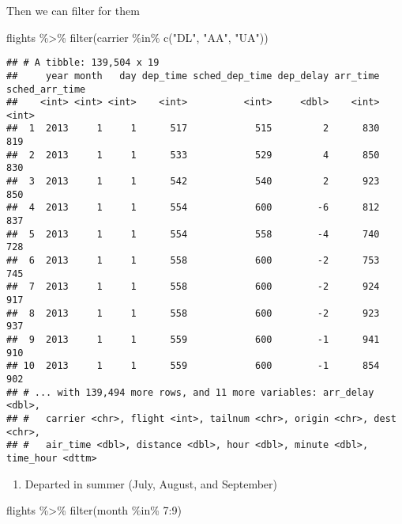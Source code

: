 \documentclass[
]{article}
\newenvironment{Shaded}{\begin{snugshade}}{\end{snugshade}}
\newcommand{\DecValTok}[1]{\textcolor[rgb]{0.00,0.00,0.81}{#1}}
\newcommand{\FunctionTok}[1]{\textcolor[rgb]{0.00,0.00,0.00}{#1}}
\newcommand{\NormalTok}[1]{#1}
\newcommand{\SpecialCharTok}[1]{\textcolor[rgb]{0.00,0.00,0.00}{#1}}
\newcommand{\StringTok}[1]{\textcolor[rgb]{0.31,0.60,0.02}{#1}}
\providecommand{\tightlist}{%
  \setlength{\itemsep}{0pt}\setlength{\parskip}{0pt}}
\begin{document}
Then we can filter for them

\begin{Shaded}
\begin{Highlighting}[]
\NormalTok{flights }\SpecialCharTok{\%\textgreater{}\%} \FunctionTok{filter}\NormalTok{(carrier }\SpecialCharTok{\%in\%} \FunctionTok{c}\NormalTok{(}\StringTok{"DL"}\NormalTok{, }\StringTok{"AA"}\NormalTok{, }\StringTok{"UA"}\NormalTok{))}
\end{Highlighting}
\end{Shaded}

\begin{verbatim}
## # A tibble: 139,504 x 19
##     year month   day dep_time sched_dep_time dep_delay arr_time sched_arr_time
##    <int> <int> <int>    <int>          <int>     <dbl>    <int>          <int>
##  1  2013     1     1      517            515         2      830            819
##  2  2013     1     1      533            529         4      850            830
##  3  2013     1     1      542            540         2      923            850
##  4  2013     1     1      554            600        -6      812            837
##  5  2013     1     1      554            558        -4      740            728
##  6  2013     1     1      558            600        -2      753            745
##  7  2013     1     1      558            600        -2      924            917
##  8  2013     1     1      558            600        -2      923            937
##  9  2013     1     1      559            600        -1      941            910
## 10  2013     1     1      559            600        -1      854            902
## # ... with 139,494 more rows, and 11 more variables: arr_delay <dbl>,
## #   carrier <chr>, flight <int>, tailnum <chr>, origin <chr>, dest <chr>,
## #   air_time <dbl>, distance <dbl>, hour <dbl>, minute <dbl>, time_hour <dttm>
\end{verbatim}

\begin{enumerate}
\def\labelenumi{\arabic{enumi}.}
\setcounter{enumi}{3}
\tightlist
\item
  Departed in summer (July, August, and September)
\end{enumerate}

\begin{Shaded}
\begin{Highlighting}[]
\NormalTok{flights }\SpecialCharTok{\%\textgreater{}\%} \FunctionTok{filter}\NormalTok{(month }\SpecialCharTok{\%in\%} \DecValTok{7}\SpecialCharTok{:}\DecValTok{9}\NormalTok{)}
\end{Highlighting}
\end{Shaded}
\end{document}

